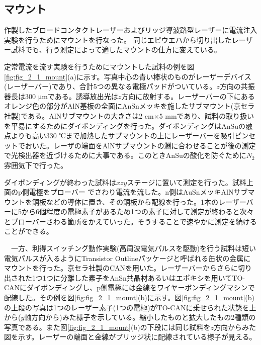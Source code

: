 \subsection{マウント}%
作製したブロードコンタクトレーザーおよびリッジ導波路型レーザーに電流注入実験を行うためにマウントを行なった。
同じエピウエハから切り出したレーザー試料でも、行う測定によって適したマウントの仕方に変えている。


定常電流を流す実験を行うためにマウントした試料の例を図\ref{fig:fig_2_1_mount}(a)に示す。写真中心の青い棒状のものがレーザーデバイス(レーザーバー)であり、合計5つの異なる電極パッドがついている。$z$方向の共振器長は300 \si{\micro\metre}である。誘導放出光は$z$方向に放射する。レーザーバーの下にあるオレンジ色の部分がAlN基板の全面にAnSnメッキを施したサブマウント(京セラ社製)である。AlNサブマウントの大きさは2 cm×5 mmであり、試料の取り扱いを平易にするためにダイボンディングを行った。ダイボンディングはAnSuの融点よりも高い330 ℃まで加熱したサブマウントの上にレーザーバーを吸引ピンセットでおいた。レーザの端面をAlNサブマウントの淵に合わせることが後の測定で光検出器を近づけるために大事である。このときAnSuの酸化を防ぐために$N_{2}$雰囲気下で行った。


ダイボンディングが終わった試料は$xzy$ステージに置いて測定を行った。試料上面のp側電極をプローバー
でさわり電流を流した。n側はAuSnメッキAlNサブマウントを銅板などの導体に置き、その銅板から配線を行った。1本のレーザーバーに5から6個程度の電極素子があるため1つの素子に対して測定が終わると次々とプローバーさわる箇所をかえていった。そうすることで速やかに測定を続けることができる。


　一方、利得スイッチング動作実験(高周波電気パルスを駆動)を行う試料は短い電気パルスが入るようにTransistor Outlineパッケージと呼ばれる缶状の金属にマウントを行った。京セラ社製のCANを用いた。レーザーバーからさらに切り出された1つ1つに分離した素子をAnSn共晶材あるいはエポキシを用いてTO-CANにダイボンディングし、p側電極には金線をワイヤーボンディングマシンで配線した。その例を図\ref{fig:fig_2_1_mount}(b)に示す。図\ref{fig:fig_2_1_mount}(b)の上段の写真は1つのレーザー素子(1つの電極)がTO-CANに乗せられた状態を上から($y$軸方向から)みた様子を示している。縮小したものと拡大したもの2種類の写真である。また図\ref{fig:fig_2_1_mount}(b)の下段には同じ試料を$z$方向からみた図を示す。レーザーの端面と金線がブリッジ状に配線されている様子が見える。

